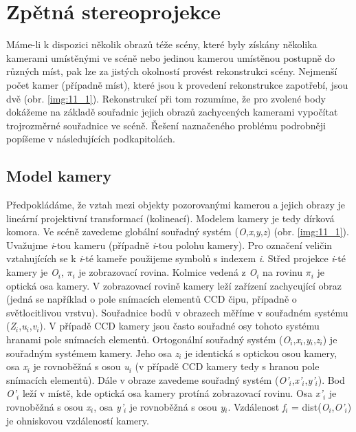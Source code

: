 \chapter*{Zpětná stereoprojekce}

Máme-li k dispozici několik obrazů téže scény, které byly získány několika kamerami umístěnými ve scéně nebo jedinou kamerou umístěnou postupně do různých míst, pak lze za jistých okolností provést rekonstrukci scény. Nejmenší počet kamer (případně míst), které jsou k provedení rekonstrukce zapotřebí, jsou dvě (obr. \ref{img:11_1}). Rekonstrukcí při tom rozumíme, že pro zvolené body dokážeme na základě souřadnic jejich obrazů zachycených kamerami vypočítat trojrozměrné souřadnice ve scéně. Řešení naznačeného problému podrobněji popíšeme v následujících podkapitolách.

\section*{Model kamery}

Předpokládáme, že vztah mezi objekty pozorovanými kamerou a jejich obrazy je lineární projektivní transformací (kolineací). Modelem kamery je tedy dírková komora. Ve scéně zavedeme globální souřadný systém (\textit{O},\textit{x},\textit{y},\textit{z}) (obr. \ref{img:11_1}). Uvažujme \textit{i}-tou kameru (případně \textit{i}-tou polohu kamery). Pro označení veličin vztahujících se k \textit{i}-té kameře použijeme symbolů s indexem \textit{i}. Střed projekce \textit{i}-té kamery je \textit{O}$_i$, $\pi_i$ je zobrazovací rovina. Kolmice vedená z \textit{O}$_i$ na rovinu $\pi_i$ je optická osa kamery. V zobrazovací rovině kamery leží zařízení zachycující obraz (jedná se například o pole snímacích elementů CCD čipu, případně o světlocitlivou vrstvu). Souřadnice bodů v obrazech měříme v souřadném systému (\textit{Z}$_i$,\textit{u}$_i$,\textit{v}$_i$). V případě CCD kamery  jsou často souřadné osy tohoto systému hranami pole snímacích elementů. Ortogonální souřadný systém (\textit{O}$_i$,\textit{x}$_i$,\textit{y}$_i$,\textit{z}$_i$) je souřadným systémem kamery. Jeho osa \textit{z}$_i$ je identická s optickou osou kamery, osa \textit{x}$_i$ je rovnoběžná s osou \textit{u}$_i$ (v případě CCD kamery tedy s hranou pole snímacích elementů). Dále v obraze zavedeme souřadný systém (\textit{O'}$_i$,\textit{x'}$_i$,\textit{y'}$_i$). Bod \textit{O'}$_i$ leží v místě, kde optická osa kamery protíná zobrazovací rovinu. Osa \textit{x'}$_i$ je rovnoběžná s osou  \textit{x}$_i$, osa \textit{y'}$_i$ je rovnoběžná s osou \textit{y}$_i$. Vzdálenost \textit{f}$_i$ = dist(\textit{O}$_i$,\textit{O'}$_i$) je ohniskovou vzdáleností kamery.

